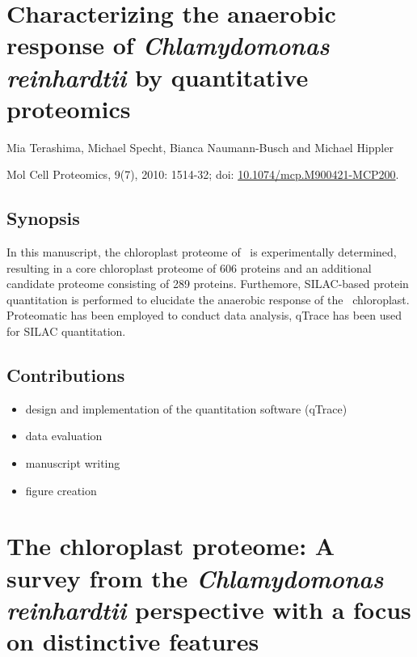 \section{Characterizing the anaerobic response of {\em Chlamydomonas reinhardtii} by quantitative proteomics}

Mia Terashima, Michael Specht, Bianca Naumann-Busch and Michael Hippler

Mol Cell Proteomics, 9(7), 2010: 1514-32; doi: \href{http://dx.doi.org/10.1074/mcp.M900421-MCP200}{10.1074/mcp.M900421-MCP200}.

\subsection*{Synopsis}

In this manuscript, the chloroplast proteome of \cre~is experimentally 
determined, resulting in a core chloroplast proteome of 606 proteins and
an additional candidate proteome consisting of 289 proteins.
Furthemore, SILAC-based protein quantitation is performed to elucidate 
the anaerobic response of the \cre~chloroplast.
Proteomatic has been employed to conduct data analysis, qTrace has been
used for SILAC quantitation.

\subsection*{Contributions}

\begin{itemize}
\item design and implementation of the quantitation software (qTrace)
\item data evaluation
\item manuscript writing
\item figure creation
\end{itemize}

{}

\cleardoublepage
\section{The chloroplast proteome: A survey from the {\em Chlamydomonas reinhardtii} perspective with a focus on distinctive features}

